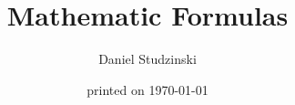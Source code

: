\documentclass[a4paper,9pt,twopage,titltpage]{amsbook}
\begin{document}
\title{Mathematic Formulas}
\date{printed on \today}
\author{Daniel Studzinski}
\maketitle\cleardoublepage

\begin{multicols}{2}
\tableofcontents\cleardoublepage














\end{multicols}

 
\end{document}
